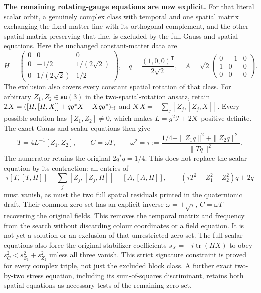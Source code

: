 \documentclass[10pt,letterpaper]{article}
\begin{document}
\noindent\textbf{The remaining rotating-gauge equations are now explicit.}
For that literal scalar orbit, a genuinely complex class with temporal
and one spatial matrix exchanging the fixed matter line with its
orthogonal complement, and the other spatial matrix preserving that
line, is excluded by the full Gauss and spatial equations. Here the
unchanged constant-matter data are
\[
 H=\begin{pmatrix}0&0&0\\0&-1/2&1/(2\sqrt2)\\
       0&1/(2\sqrt2)&1/2\end{pmatrix},\quad
 q=\frac{(1,0,0)^{\mathsf T}}{2\sqrt2},\quad
 A=\sqrt2\begin{pmatrix}0&-1&0\\1&0&0\\0&0&0\end{pmatrix}.
\]
The exclusion
also covers every constant spatial rotation of that class. For arbitrary
$Z_1,Z_2\in\mathfrak{su}(3)$ in the two-spatial-rotation ansatz, retain
$\mathcal IX=([H,[H,X]]+qq^*X+Xqq^*)_{\rm tf}$ and
$\mathcal KX=-\sum_j[Z_j,[Z_j,X]]$. Every possible solution has
$[Z_1,Z_2]\ne0$, which makes $L=g^2\mathcal I+2\mathcal K$ positive
definite. The exact Gauss and scalar equations then give
\[
 T=4L^{-1}[Z_1,Z_2],\qquad C=\omega T,\qquad
 \omega^2=\tau:=\frac{1/4+\|Z_1q\|^2+\|Z_2q\|^2}{\|Tq\|^2}.
\]
The numerator retains the original $2q^*q=1/4$. This does not replace
the scalar equation by its contraction: all entries of
\[
 \tau[T,[T,H]]-\sum_j[Z_j,[Z_j,H]]-[A,[A,H]],\qquad
 (\tau T^2-Z_1^2-Z_2^2)q+2q
\]
must vanish, as must the two full spatial residuals printed in the
quaternionic draft. Their common zero set has an explicit inverse
$\omega=\pm\sqrt\tau$, $C=\omega T$ recovering the original fields.
This removes the temporal matrix and frequency from the search without
discarding colour coordinates or a field equation. It is not yet a
solution or an exclusion of that unrestricted zero set.
The full scalar equations also force the original stabilizer
coefficients $s_X=-i\operatorname{tr}(HX)$ to obey
$s_C^2<s_{Z_1}^2+s_{Z_2}^2$ unless all three vanish.
This strict signature constraint is proved for every complex triple,
not just the excluded block class. A further exact two-by-two stress
equation, including its sum-of-squares discriminant, retains both
spatial equations as necessary tests of the remaining zero set.
\end{document}
